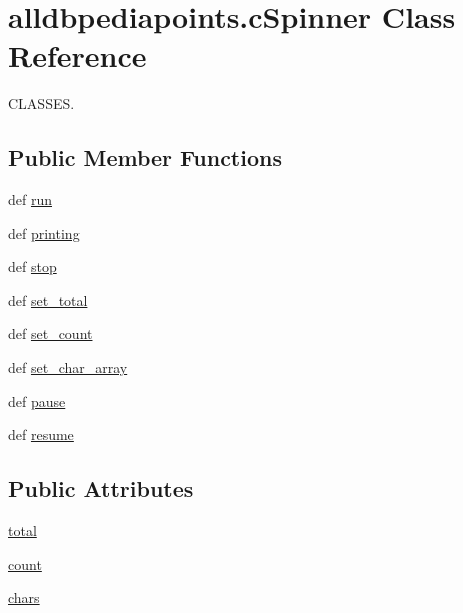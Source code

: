 \hypertarget{classalldbpediapoints_1_1cSpinner}{\section{alldbpediapoints.\-c\-Spinner \-Class \-Reference}
\label{classalldbpediapoints_1_1cSpinner}
}


\-C\-L\-A\-S\-S\-E\-S.  


\subsection*{\-Public \-Member \-Functions}
\begin{DoxyCompactItemize}
\item 
def \hyperlink{classalldbpediapoints_1_1cSpinner_ae3b2ce081f917ab9196e4a308ae8125c}{run}
\item 
def \hyperlink{classalldbpediapoints_1_1cSpinner_a40b03d71f85f84c4b6782b3d481eeeb2}{printing}
\item 
def \hyperlink{classalldbpediapoints_1_1cSpinner_a02c0f76e03945b0ce3dc7d6b4489fe14}{stop}
\item 
def \hyperlink{classalldbpediapoints_1_1cSpinner_ab7da48c5c957a3a16551e73eced70dd3}{set\-\_\-total}
\item 
def \hyperlink{classalldbpediapoints_1_1cSpinner_a2de48a514d6f5fd13fe5bc4db8264fd5}{set\-\_\-count}
\item 
def \hyperlink{classalldbpediapoints_1_1cSpinner_ad2b01102ba3b8bbbae1c43bdb6b9a0d5}{set\-\_\-char\-\_\-array}
\item 
def \hyperlink{classalldbpediapoints_1_1cSpinner_af192dee2d58fad2cc95d595fd34b03e6}{pause}
\item 
def \hyperlink{classalldbpediapoints_1_1cSpinner_abc9882b49269c9146a9d0e89f7821403}{resume}
\end{DoxyCompactItemize}
\subsection*{\-Public \-Attributes}
\begin{DoxyCompactItemize}
\item 
\hyperlink{classalldbpediapoints_1_1cSpinner_a1d2a34e4e7d11115d7eddc27aa321c46}{total}
\item 
\hyperlink{classalldbpediapoints_1_1cSpinner_a3651a90b8736423c81e19ce9464483ca}{count}
\item 
\hyperlink{classalldbpediapoints_1_1cSpinner_a67c5d6dde7dbe7dceaad6a98a0b88441}{chars}
\end{DoxyCompactItemize}
